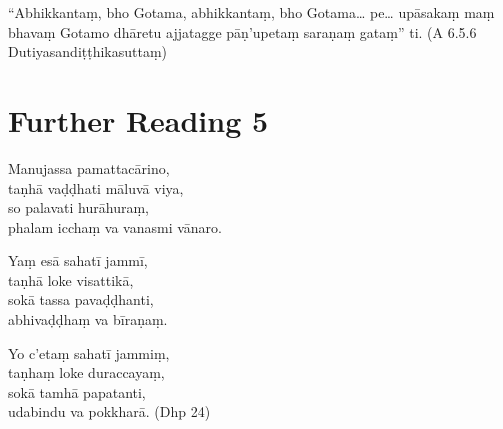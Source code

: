 “Abhikkantaṃ, bho Gotama, abhikkantaṃ, bho Gotama… pe… upāsakaṃ maṃ bhavaṃ Gotamo dhāretu ajjatagge pāṇ’upetaṃ saraṇaṃ gataṃ” ti. \hfill(A 6.5.6 Dutiyasandiṭṭhikasuttaṃ)

\section*{Further Reading 5}

Manujassa pamattacārino,\\
taṇhā vaḍḍhati māluvā viya,\\
so palavati hurāhuraṃ,\\
phalam icchaṃ va vanasmi vānaro.

Yaṃ esā sahatī jammī,\\
taṇhā loke visattikā,\\
sokā tassa pavaḍḍhanti,\\
abhivaḍḍhaṃ va bīraṇaṃ.

Yo c’etaṃ sahatī jammiṃ,\\
taṇhaṃ loke duraccayaṃ,\\
sokā tamhā papatanti,\\
udabindu va pokkharā. \hfill(Dhp 24)